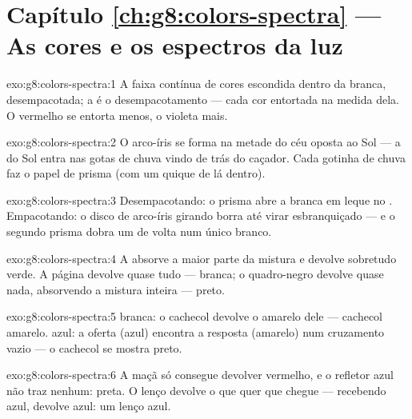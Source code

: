 \section*{Capítulo \ref{ch:g8:colors-spectra} --- As cores e os espectros da luz}

\begin{solution}{exo:g8:colors-spectra:1}
A faixa contínua de cores escondida dentro da  branca,
desempacotada; a  é o desempacotamento --- cada cor entortada
na medida dela. O vermelho se entorta menos, o violeta mais.
\end{solution}

\begin{solution}{exo:g8:colors-spectra:2}
O arco-íris se forma na metade do céu oposta ao Sol --- a  do Sol
entra nas gotas de chuva vindo de trás do caçador. Cada gotinha de
chuva faz o papel de prisma (com um quique de  lá dentro).
\end{solution}

\begin{solution}{exo:g8:colors-spectra:3}
Desempacotando: o prisma abre a  branca em leque no .
Empacotando: o disco de arco-íris girando borra até virar
esbranquiçado --- e o segundo prisma dobra um  de volta num
único  branco.
\end{solution}

\begin{solution}{exo:g8:colors-spectra:4}
A  absorve a maior parte da mistura e devolve sobretudo verde. A
página devolve quase tudo --- branca; o quadro-negro devolve quase
nada, absorvendo a mistura inteira --- preto.
\end{solution}

\begin{solution}{exo:g8:colors-spectra:5}
 branca: o cachecol devolve o amarelo dele --- cachecol amarelo.
 azul: a oferta (azul) encontra a resposta (amarelo) num cruzamento
vazio --- o cachecol se mostra preto.
\end{solution}

\begin{solution}{exo:g8:colors-spectra:6}
A maçã só consegue devolver vermelho, e o refletor azul não traz
nenhum: preta. O lenço devolve o que quer que chegue --- recebendo
azul, devolve azul: um lenço azul.
\end{solution}

